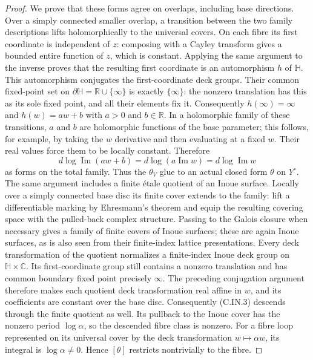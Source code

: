 \begin{proof}
We prove that these forms agree on overlaps, including base
directions. Over a simply connected smaller overlap, a transition
between the two family descriptions lifts holomorphically to the
universal covers. On each fibre its first coordinate is independent
of $z$: composing with a Cayley transform gives a bounded entire
function of $z$, which is constant. Applying the same argument to
the inverse proves that the resulting first coordinate is an
automorphism $h$ of $\mathbb H$. This automorphism conjugates the
first-coordinate deck groups. Their common fixed-point set on
$\partial\mathbb H=\mathbb R\cup\{\infty\}$ is exactly
$\{\infty\}$: the nonzero translation has this as its sole fixed
point, and all their elements fix it. Consequently $h(\infty)=
\infty$ and $h(w)=a w+b$ with $a>0$ and $b\in\mathbb R$.
In a holomorphic family of these transitions, $a$ and $b$ are
holomorphic functions of the base parameter; this follows, for
example, by taking the $w$ derivative and then evaluating at a
fixed $w$. Their real values force them to be locally constant.
Therefore
\[
 d\log\operatorname{Im}(a w+b)
 =d\log(a\operatorname{Im}w)
 =d\log\operatorname{Im}w
\tag{C.IN.4}
\]
as forms on the total family. Thus the $\theta_V$ glue to an
actual closed form $\theta$ on $Y^\circ$.
The same argument includes a finite \'etale quotient of an Inoue
surface. Locally over a simply connected base disc its finite
cover extends to the family: lift a differentiable marking by
Ehresmann's theorem and equip the resulting covering space with
the pulled-back complex structure. Passing to the Galois closure
when necessary gives a family of finite covers of Inoue surfaces;
these are again Inoue surfaces, as is also seen from their
finite-index lattice presentations. Every deck transformation of
the quotient normalizes a finite-index Inoue deck group on
$\mathbb H\times\mathbb C$. Its first-coordinate group still
contains a nonzero translation and has common boundary fixed
point precisely $\infty$. The preceding conjugation argument
therefore makes each quotient deck transformation real affine in
$w$, and its coefficients are constant over the base disc.
Consequently (C.IN.3) descends through the finite quotient as
well. Its pullback to the Inoue cover has the nonzero period
$\log\alpha$, so the descended fibre class is nonzero.
For a fibre loop represented on its universal cover by the deck
transformation $w\mapsto\alpha w$, its integral is
$\log\alpha\ne0$. Hence $[\theta]$ restricts nontrivially to
the fibre.


\end{proof}
